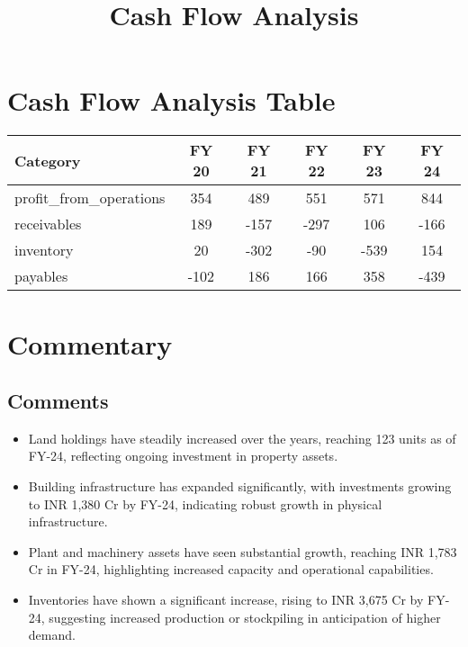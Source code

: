 \documentclass{article}
\begin{document}
\title{\textbf{Cash Flow Analysis}}
\date{}
\maketitle

\section*{Cash Flow Analysis Table}

\begin{tabularx}{\textwidth}{|X|c|c|c|c|c|}
    \hline
    \rowcolor{blue!20}
    \textbf{Category} & \textbf{FY 20} & \textbf{FY 21} & \textbf{FY 22} & \textbf{FY 23} & \textbf{FY 24} \\
    \hline
    
    profit_from_operations &  354 &  489 &  551 &  571 &  844 &  \\
    \hline
    
    receivables &  189 &  -157 &  -297 &  106 &  -166 &  \\
    \hline
    
    inventory &  20 &  -302 &  -90 &  -539 &  154 &  \\
    \hline
    
    payables &  -102 &  186 &  166 &  358 &  -439 &  \\
    \hline
    
\end{tabularx}

\section*{Commentary}
\begin{tcolorbox}[colback=white]
\subsection*{Comments}
\begin{itemize}
    \renewcommand\labelitemi{--}
    
    \item Land holdings have steadily increased over the years, reaching 123 units as of FY-24, reflecting ongoing investment in property assets.
    
    \item Building infrastructure has expanded significantly, with investments growing to INR 1,380 Cr by FY-24, indicating robust growth in physical infrastructure.
    
    \item Plant and machinery assets have seen substantial growth, reaching INR 1,783 Cr in FY-24, highlighting increased capacity and operational capabilities.
    
    \item Inventories have shown a significant increase, rising to INR 3,675 Cr by FY-24, suggesting increased production or stockpiling in anticipation of higher demand.
    
\end{itemize}
\end{tcolorbox}
\end{document}
